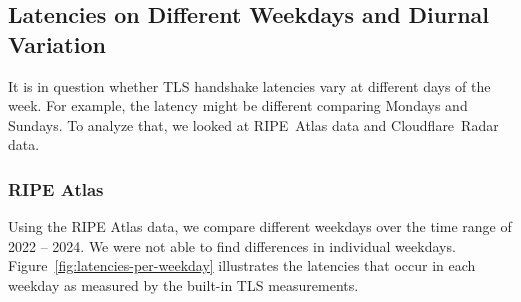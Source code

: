 \subsection{Latencies on Different Weekdays and Diurnal Variation}
\label{sec:latency-weekdays}

It is in question whether TLS handshake latencies vary at different days of the
week. For example, the latency might be different comparing Mondays and
Sundays. To analyze that, we looked at RIPE~Atlas data and Cloudflare~Radar
data.

\subsubsection*{RIPE Atlas}

Using the RIPE Atlas data, we compare different weekdays over the time range of
2022 -- 2024. We were not able to find differences in individual weekdays.
Figure~\ref{fig:latencies-per-weekday} illustrates the latencies that occur in
each weekday as measured by the built-in TLS measurements.

